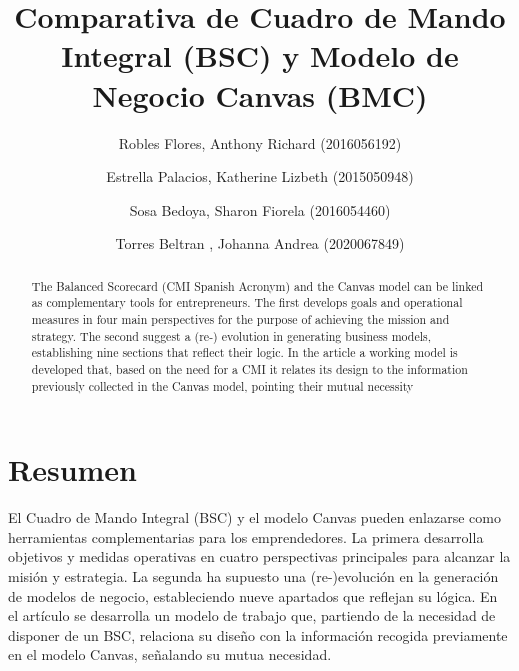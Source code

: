 \documentclass[preprint,12pt]{elsarticle}
\begin{document}
	
	\begin{frontmatter}

		\title{\huge  Comparativa de Cuadro de Mando Integral (BSC) y Modelo de Negocio Canvas (BMC) }
		\author{Robles Flores, Anthony Richard	                (2016056192)}
		\author{Estrella Palacios, Katherine Lizbeth			(2015050948)}
		\author{Sosa Bedoya, Sharon Fiorela				(2016054460)}
		\author{Torres Beltran , Johanna Andrea			(2020067849)}
		\address{Tacna, Perú}
		


\begin{abstract}
The Balanced Scorecard (CMI Spanish Acronym) and the Canvas model can be linked as complementary tools for entrepreneurs. The first develops goals and operational measures in four main perspectives for the purpose of achieving the mission and strategy. The second suggest a (re-) evolution in generating business models, establishing nine sections that reflect their logic. In the article a working model is developed that, based on the need for a CMI it relates its design to the information previously collected in the Canvas model, pointing their mutual necessity
\end{abstract}


\end{frontmatter}

\section{Resumen}
El Cuadro de Mando Integral (BSC) y el modelo Canvas pueden enlazarse como herramientas complementarias para los emprendedores. La primera desarrolla objetivos y medidas operativas en cuatro perspectivas principales para alcanzar la misión y estrategia. La segunda ha supuesto una (re-)evolución en la generación de modelos de negocio, estableciendo nueve apartados que reflejan su lógica. En el artículo se desarrolla un modelo de trabajo que, partiendo de la necesidad de disponer de un BSC, relaciona su diseño con la información recogida previamente en el modelo Canvas, señalando su mutua necesidad.


\end{document}
